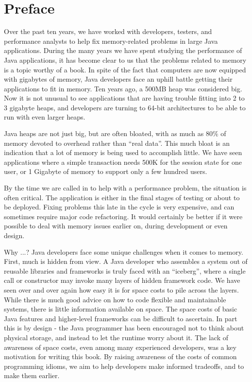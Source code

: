 \chapter*{Preface}

Over the past ten years, we have worked with developers, testers, and performance analysts to help fix memory-related problems in large Java applications.  During the many years we have spent studying the performance of Java applications, it has become clear to us that the problems related to memory is a topic worthy of a book. 
In spite of the fact that computers are now equipped with gigabytes of memory, Java developers face an uphill battle getting their applications to fit in memory. Ten years ago, a 500MB heap was considered big. Now it is not unusual to see applications that are having trouble fitting into 2 to 3 gigabyte heaps, and developers are turning to 64-bit architectures to be able to run with even larger heaps.  

Java heaps are not just big, but are often bloated, with as much as 80\% of memory devoted to overhead rather than "`real data"'. This much bloat is an indication that a lot of memory is being used to accomplish little. We have seen applications where a simple transaction needs 500K for the session state for one user, or 1 Gigabyte of memory to support only a few hundred users. 

By the time we are called in to help with a performance problem, the situation is often critical. The application is either in the final stages of testing or about to be deployed. Fixing problems this late in the cycle is very expensive, and can sometimes require major code refactoring. It would certainly be better if it were possible to deal with memory issues earlier on, during development or even design.

Why ...? Java developers face some unique challenges when it comes to memory. First, much is hidden from view. A Java developer who assembles a system out of reusable libraries and frameworks is truly faced with an "`iceberg"', where a single call or constructor may invoke many layers of hidden framework code. We have seen over and over again how easy it is for space costs to pile across the layers. %
While there is much good advice on how to code flexible and maintainable systems, there is little information available on space. The space costs of basic Java features and higher-level frameworks can be difficult to ascertain. In part this is by design - the Java programmer has been encouraged not to think about physical storage, and instead to let the runtime worry about it. The lack of awareness of space costs, even among many experienced developers, was a key motivation for writing this book. By raising awareness of the costs of common programming idioms, we aim to help developers make informed tradeoffs, and to make them earlier.

